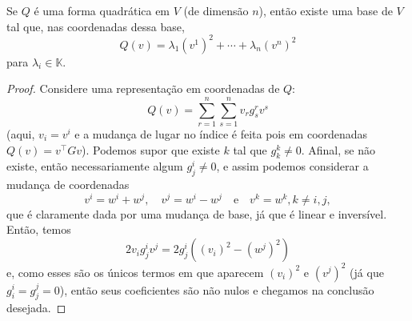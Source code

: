 \begin{theorem}
    Se $Q$ é uma forma quadrática em $V$ (de dimensão $n$), então existe uma base de $V$ tal que, nas coordenadas dessa base, \begin{equation}
        Q(v) = \lambda_1 (v^1)^2 + \cdots + \lambda_n (v^n)^2
    \end{equation} para $\lambda_i \in \mathbb{K}$.
\end{theorem}
\begin{proof}
    Considere uma representação em coordenadas de $Q$: \begin{equation}
        Q(v) = \sum_{r = 1}^n \sum_{s = 1}^n v_r g^r_s v^s
    \end{equation} (aqui, $v_i = v^i$ e a mudança de lugar no índice é feita pois em coordenadas $Q(v) = v^\top G v$). Podemos supor que existe $k$ tal que $g^k_k \neq 0$. Afinal, se não existe, então necessariamente algum $g^i_j \neq 0$, e assim podemos considerar a mudança de coordenadas \begin{equation}
        v^i = w^i + w^j, \quad v^j = w^i - w^j \quad \text{e} \quad v^k = w^k, k \neq i,j,
    \end{equation} que é claramente dada por uma mudança de base, já que é linear e inversível. Então, temos \begin{equation}
        2 v_i g^i_j v^j = 2 g^i_j((v_i)^2 - (w^j)^2)
    \end{equation} e, como esses são os únicos termos em que aparecem $(v_i)^2$ e $(v^j)^2$ (já que $g^i_i = g^j_j = 0$), então seus coeficientes são não nulos e chegamos na conclusão desejada.


\end{proof}
